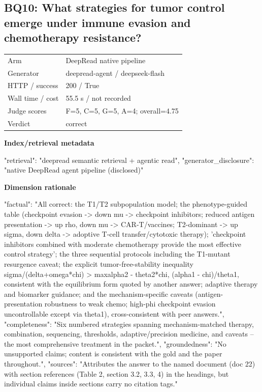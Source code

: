 \documentclass[10pt]{article}
\begin{document}
\subsection{BQ10: What strategies for tumor control emerge under immune evasion and chemotherapy resistance?}
\begin{tabular}{@{}ll@{}}
Arm & DeepRead native pipeline\\
Generator & deepread-agent / deepseek-flash\\
HTTP / success & 200 / True\\
Wall time / cost & 55.5 s / not recorded\\
Judge scores & F=5, C=5, G=5, A=4; overall=4.75\\
Verdict & correct\\
\end{tabular}

\textbf{Index/retrieval metadata}
\begin{EvidenceText}
{
  "retrieval": "deepread semantic retrieval + agentic read",
  "generator_disclosure": "native DeepRead agent pipeline (disclosed)"
}
\end{EvidenceText}

\textbf{Dimension rationale}
\begin{EvidenceText}
{
  "factual": "All correct: the T1/T2 subpopulation model; the phenotype-guided table (checkpoint evasion -> down mu -> checkpoint inhibitors; reduced antigen presentation -> up rho, down mu -> CAR-T/vaccines; T2-dominant -> up sigma, down delta -> adoptive T-cell transfer/cytotoxic therapy); 'checkpoint inhibitors combined with moderate chemotherapy provide the most effective control strategy'; the three sequential protocols including the T1-mutant resurgence caveat; the explicit tumor-free-stability inequality sigma/(delta+omega*chi) > max{alpha2 - theta2*chi, (alpha1 - chi)/theta1}, consistent with the equilibrium form quoted by another answer; adaptive therapy and biomarker guidance; and the mechanism-specific caveats (antigen-presentation robustness to weak chemo; high-phi checkpoint evasion uncontrollable except via theta1), cross-consistent with peer answers.",
  "completeness": "Six numbered strategies spanning mechanism-matched therapy, combination, sequencing, thresholds, adaptive/precision medicine, and caveats -- the most comprehensive treatment in the packet.",
  "groundedness": "No unsupported claims; content is consistent with the gold and the paper throughout.",
  "sources": "Attributes the answer to the named document (doc 22) with section references (Table 2, section 3.2, 3.3, 4) in the headings, but individual claims inside sections carry no citation tags."
}
\end{EvidenceText}
\end{document}
